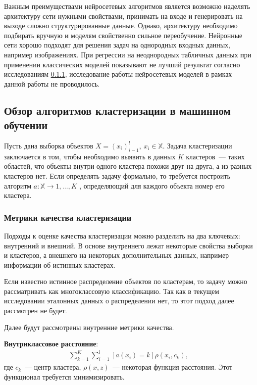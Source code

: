 \documentclass[12pt,a4paper]{article} %
\begin{document}
Важным преимуществами нейросетевых алгоритмов является возможно наделять архитектуру сети нужными свойствами, принимать на входе и генерировать на выходе сложно структурированные данные. Однако, архитектуру необходимо подбирать вручную и моделям свойственно сильное переобучение. Нейронные сети хорошо подходят для решения задач на однородных входных данных, например изображениях. При регрессии на неоднородных табличных данных при применении классических моделей показывают не лучший результат согласно исследованиям \ref{}, исследование работы нейросетевых моделей в рамках данной работы не проводилось.

\subsection{Обзор алгоритмов  кластеризации в машинном обучении}

Пусть дана выборка объектов $X = (x_i)_{i-1}^{l},~x_i\in\mathbb{X}$. Задача кластеризации заключается в том, чтобы необходимо выявить в данных $K$ кластеров~--- таких областей, что объекты внутри одного кластера похожи друг на друга, а из разных кластеров нет. Если определять задачу формально, то требуется построить алгоритм $a: \mathbb{X}\rightarrow{1,\dots,K}$ , определяющий для каждого объекта номер его кластера.

\subsubsection{Метрики качества кластеризации}
Подходы к оценке качества кластеризации можно разделить на два ключевых: внутренний и внешний. В основе внутреннего лежат некоторые свойства выборки и кластеров, а внешнего на некоторых дополнительных данных, например информации об истинных кластерах.

Если известно истинное распределение объектов по кластерам, то задачу можно рассматривать как многоклассовую классификацию. Так как в текущем исследовании эталонных данных о распределении нет, то этот подход далее рассмотрен не будет.

Далее будут рассмотрены внутренние метрики качества. 

\textbf{Внутриклассовое расстояние}:
\begin{gather}\label{klastdist1}
	\sum\limits_{k=1}^{K}\sum\limits_{i=1}^{l}[a(x_i)=k]\rho(x_i, c_k),
\end{gather}
где $c_k$~--- центр кластера, $\rho(x,z)$~--- некоторая функция расстояния. Этот функционал требуется минимизировать.
\end{document}
